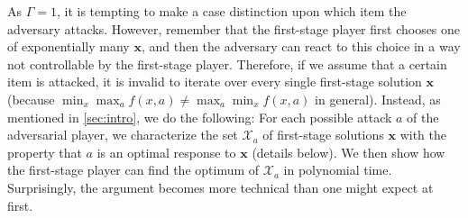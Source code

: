 \documentclass[a4paper,11pt,abstracton]{scrartcl}
\theoremstyle{definition}
\theoremstyle{remark}
\newcommand{\X}{\mathcal{X}}
\begin{document}
As $\Gamma = 1$, it is tempting to make a case distinction upon which item the adversary attacks. However, remember that the first-stage player first chooses one of exponentially many $\pmb x$, and then the adversary can react to this choice in a way not controllable by the first-stage player. Therefore, if we assume that a certain item is attacked, it is invalid to iterate over every single first-stage solution $\pmb x$ (because $\min_x \max_a f(x,a) \neq \max_a \min_x f(x,a)$ in general). Instead, as mentioned in \cref{sec:intro}, we do the following: For each possible attack $a$ of the adversarial player, we characterize the set $\X_a$ of first-stage solutions $\pmb x$ with the property that $a$ is an optimal response to $\pmb x$ (details below). We then show how the first-stage player can find the optimum of $\X_a$ in polynomial time. Surprisingly, the argument becomes more technical than one might expect at first.
\end{document}
